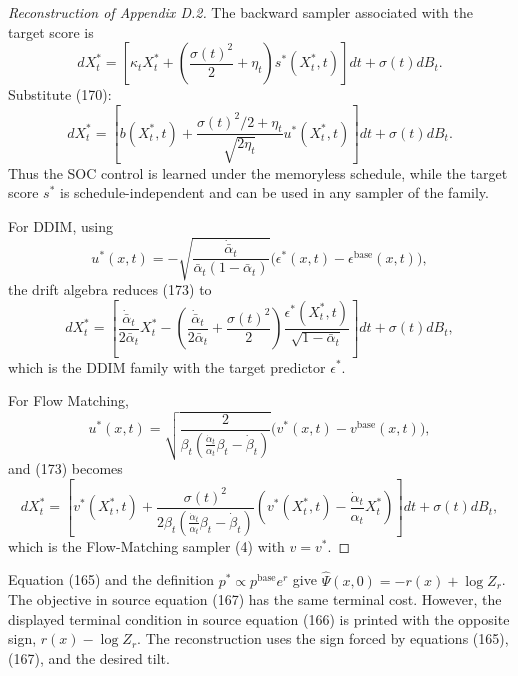 \begin{proof}[Reconstruction of Appendix D.2]
The backward sampler associated with the target score is
\begin{equation*}
 dX_t^*
 =\left[
 \kappa_tX_t^*+
 \left(\frac{\sigma(t)^2}{2}+\eta_t\right)s^*(X_t^*,t)
 \right]dt+\sigma(t)dB_t.
 \tag{171}
\end{equation*}
Substitute (170):
\begin{equation*}
 dX_t^*
 =\left[
 b(X_t^*,t)
 +\frac{\sigma(t)^2/2+\eta_t}{\sqrt{2\eta_t}}u^*(X_t^*,t)
 \right]dt+\sigma(t)dB_t.
 \tag{173}
\end{equation*}
Thus the SOC control is learned under the memoryless schedule, while the target score $s^*$ is schedule-independent and can be used in any sampler of the family.

For DDIM, using
\[
 u^*(x,t)=
 -\sqrt{\frac{\dot{\bar\alpha}_t}{\bar\alpha_t(1-\bar\alpha_t)}}
 \bigl(\epsilon^*(x,t)-\epsilon^{\mathrm{base}}(x,t)\bigr),
 \tag{26}
\]
the drift algebra reduces (173) to
\begin{equation*}
 dX_t^*
 =\left[
 \frac{\dot{\bar\alpha}_t}{2\bar\alpha_t}X_t^*
 -\left(
 \frac{\dot{\bar\alpha}_t}{2\bar\alpha_t}+\frac{\sigma(t)^2}{2}
 \right)
 \frac{\epsilon^*(X_t^*,t)}{\sqrt{1-\bar\alpha_t}}
 \right]dt+\sigma(t)dB_t,
 \tag{176}
\end{equation*}
which is the DDIM family with the target predictor $\epsilon^*$.

For Flow Matching,
\[
 u^*(x,t)=
 \sqrt{\frac{2}{\beta_t(\frac{\dot\alpha_t}{\alpha_t}\beta_t-\dot\beta_t)}}
 \bigl(v^*(x,t)-v^{\mathrm{base}}(x,t)\bigr),
 \tag{27}
\]
and (173) becomes
\begin{equation*}
 dX_t^*=
 \left[
 v^*(X_t^*,t)
 +\frac{\sigma(t)^2}{2\beta_t(\frac{\dot\alpha_t}{\alpha_t}\beta_t-\dot\beta_t)}
 \left(v^*(X_t^*,t)-\frac{\dot\alpha_t}{\alpha_t}X_t^*\right)
 \right]dt+\sigma(t)dB_t,
 \tag{179}
\end{equation*}
which is the Flow-Matching sampler (4) with $v=v^*$.
\end{proof}

\begin{remark}
Equation (165) and the definition $p^*\propto p^{\mathrm{base}}e^r$ give
$\widehat\Psi(x,0)=-r(x)+\log Z_r$.  The objective in source equation (167) has the same terminal cost.  However, the displayed terminal condition in source equation (166) is printed with the opposite sign, $r(x)-\log Z_r$.  The reconstruction uses the sign forced by equations (165), (167), and the desired tilt.
\end{remark}

